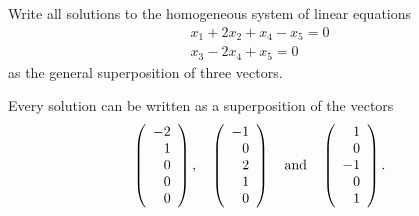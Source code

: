 \documentclass{ximera}
\begin{document}
\begin{exercise} \label{c4.4.2}
Write all solutions to the homogeneous system of linear
equations
\begin{eqnarray*}
x_1+2x_2+x_4-x_5 = 0\\
x_3-2x_4+x_5 = 0
\end{eqnarray*}
as the general superposition of three vectors.

\begin{solution}

\ans Every solution can be written as a superposition of the vectors
\[
\left(\begin{array}{r} -2 \\ 1 \\ 0 \\ 0 \\ 0\end{array}\right), \quad
\left(\begin{array}{r} -1 \\ 0 \\ 2 \\ 1 \\ 0 \end{array}\right) \quad\mbox{and}\quad
\left(\begin{array}{r} 1 \\ 0 \\ -1 \\ 0 \\ 1 \end{array}\right).
\]


\end{solution}
\end{exercise}
\end{document}
